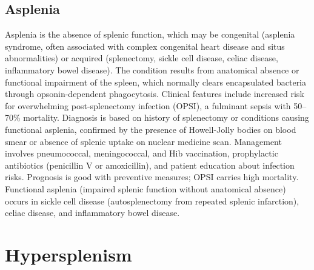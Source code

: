 \subsection{Asplenia}
\label{sec:Asplenia}
Asplenia is the absence of splenic function, which may be congenital (asplenia syndrome, often associated with complex congenital heart disease and situs abnormalities) or acquired (splenectomy, sickle cell disease, celiac disease, inflammatory bowel disease). The condition results from anatomical absence or functional impairment of the spleen, which normally clears encapsulated bacteria through opsonin-dependent phagocytosis. Clinical features include increased risk for overwhelming post-splenectomy infection (OPSI), a fulminant sepsis with 50--70\% mortality. Diagnosis is based on history of splenectomy or conditions causing functional asplenia, confirmed by the presence of Howell-Jolly bodies on blood smear or absence of splenic uptake on nuclear medicine scan. Management involves pneumococcal, meningococcal, and Hib vaccination, prophylactic antibiotics (penicillin V or amoxicillin), and patient education about infection risks. Prognosis is good with preventive measures; OPSI carries high mortality. Functional asplenia (impaired splenic function without anatomical absence) occurs in sickle cell disease (autosplenectomy from repeated splenic infarction), celiac disease, and inflammatory bowel disease.

\section{Hypersplenism}








\label{sec:section:Hypersplenism}

